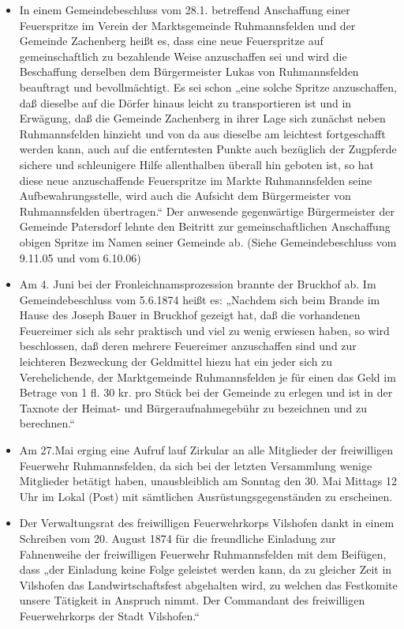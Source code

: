 \documentclass[12pt,a4paper]{book}
\begin{document}
\begin{itemize}
\item In einem Gemeindebeschluss vom 28.1. betreffend Anschaffung einer
Feuerspritze im Verein der Marktsgemeinde Ruhmannsfelden und der
Gemeinde Zachenberg heißt es, dass eine neue Feuerspritze auf
gemeinschaftlich zu bezahlende Weise anzuschaffen sei und wird die
Beschaffung derselben dem Bürgermeister Lukas von Ruhmannsfelden
beauftragt und bevollmächtigt. Es sei schon „eine solche Spritze
anzuschaffen, daß dieselbe auf die Dörfer hinaus leicht zu
transportieren ist und in Erwägung, daß die Gemeinde Zachenberg in ihrer
Lage sich zunächst neben Ruhmannsfelden hinzieht und von da aus dieselbe
am leichtest fortgeschafft werden kann, auch auf die entferntesten
Punkte auch bezüglich der Zugpferde sichere und schleunigere Hilfe
allenthalben überall hin geboten ist, so hat diese neue anzuschaffende
Feuerspritze im Markte Ruhmannsfelden seine Aufbewahrungsstelle, wird
auch die Aufsicht dem Bürgermeister von Ruhmannsfelden übertragen.“ Der
anwesende gegenwärtige Bürgermeister der Gemeinde Patersdorf lehnte den
Beitritt zur gemeinschaftlichen Anschaffung obigen Spritze im Namen
seiner Gemeinde ab. (Siehe Gemeindebeschluss vom 9.11.05 und vom
6.10.06)

\item Am 4. Juni bei der Fronleichnamsprozession brannte der Bruckhof
ab. Im Gemeindebeschluss vom 5.6.1874 heißt es: „Nachdem sich beim
Brande im Hause des Joseph Bauer in Bruckhof gezeigt hat, daß die
vorhandenen Feuereimer sich als sehr praktisch und viel zu wenig
erwiesen haben, so wird beschlossen, daß deren mehrere Feuereimer
anzuschaffen sind und zur leichteren Bezweckung der Geldmittel hiezu hat
ein jeder sich zu Verehelichende, der Marktgemeinde Ruhmannsfelden je
für einen das Geld im Betrage von 1 fl. 30 kr. pro Stück bei der
Gemeinde zu erlegen und ist in der Taxnote der Heimat- und
Bürgeraufnahmegebühr zu bezeichnen und zu berechnen.“

\item Am 27.Mai erging eine Aufruf lauf Zirkular an alle Mitglieder der
freiwilligen Feuerwehr Ruhmannsfelden, da sich bei der letzten
Versammlung wenige Mitglieder betätigt haben, unausbleiblich am Sonntag
den 30. Mai Mittags 12 Uhr im Lokal (Post) mit sämtlichen
Ausrüstungsgegenständen zu erscheinen.

\item Der Verwaltungsrat des freiwilligen Feuerwehrkorps Vilshofen dankt
in einem Schreiben vom 20. August 1874 für die freundliche Einladung zur
Fahnenweihe der freiwilligen Feuerwehr Ruhmannsfelden mit dem Beifügen,
dass „der Einladung keine Folge geleistet werden kann, da zu gleicher
Zeit in Vilshofen das Landwirtschaftsfest abgehalten wird, zu welchen
das Festkomite unsere Tätigkeit in Anspruch nimmt. Der Commandant des
freiwilligen Feuerwehrkorps der Stadt Vilshofen.“


\end{itemize}
\end{document}
